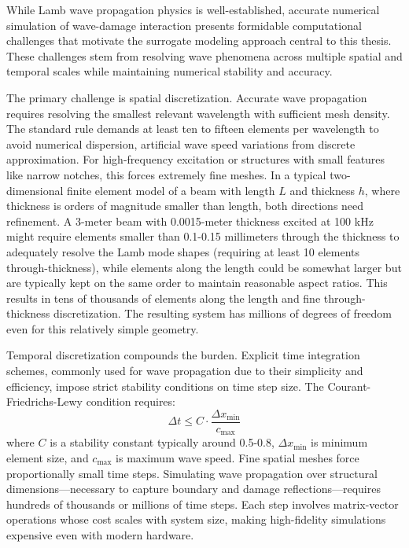\documentclass[12pt,a4paper]{report}
\begin{document}
While Lamb wave propagation physics is well-established, accurate numerical simulation of wave-damage interaction presents formidable computational challenges that motivate the surrogate modeling approach central to this thesis. These challenges stem from resolving wave phenomena across multiple spatial and temporal scales while maintaining numerical stability and accuracy.

The primary challenge is spatial discretization. Accurate wave propagation requires resolving the smallest relevant wavelength with sufficient mesh density. The standard rule demands at least ten to fifteen elements per wavelength to avoid numerical dispersion, artificial wave speed variations from discrete approximation. For high-frequency excitation or structures with small features like narrow notches, this forces extremely fine meshes. In a typical two-dimensional finite element model of a beam with length $L$ and thickness $h$, where thickness is orders of magnitude smaller than length, both directions need refinement. A 3-meter beam with 0.0015-meter thickness excited at 100 kHz might require elements smaller than 0.1-0.15 millimeters through the thickness to adequately resolve the Lamb mode shapes (requiring at least 10 elements through-thickness), while elements along the length could be somewhat larger but are typically kept on the same order to maintain reasonable aspect ratios. This results in tens of thousands of elements along the length and fine through-thickness discretization. The resulting system has millions of degrees of freedom even for this relatively simple geometry.

Temporal discretization compounds the burden. Explicit time integration schemes, commonly used for wave propagation due to their simplicity and efficiency, impose strict stability conditions on time step size. The Courant-Friedrichs-Lewy condition requires:
\begin{equation}
\Delta t \leq C \cdot \frac{\Delta x_{\min}}{c_{\max}}
\end{equation}
where $C$ is a stability constant typically around 0.5-0.8, $\Delta x_{\min}$ is minimum element size, and $c_{\max}$ is maximum wave speed. Fine spatial meshes force proportionally small time steps. Simulating wave propagation over structural dimensions—necessary to capture boundary and damage reflections—requires hundreds of thousands or millions of time steps. Each step involves matrix-vector operations whose cost scales with system size, making high-fidelity simulations expensive even with modern hardware.
\end{document}
